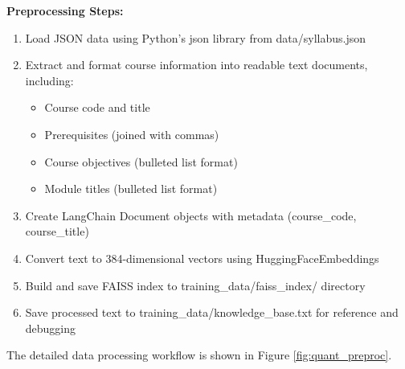 \documentclass[conference]{IEEEtran}
\begin{document}
\textbf{Preprocessing Steps:}
\begin{enumerate}
    \item Load JSON data using Python's json library from data/syllabus.json
    \item Extract and format course information into readable text documents, including:
        \begin{itemize}
           \item Course code and title
           \item Prerequisites (joined with commas)
           \item Course objectives (bulleted list format)
           \item Module titles (bulleted list format)
        \end{itemize}
    \item Create LangChain Document objects with metadata (course\_code, course\_title)
    \item Convert text to 384-dimensional vectors using HuggingFaceEmbeddings
    \item Build and save FAISS index to training\_data/faiss\_index/ directory
    \item Save processed text to training\_data/knowledge\_base.txt for reference and debugging
\end{enumerate}

The detailed data processing workflow is shown in Figure \ref{fig:quant_preproc}.

\begin{table}[t!]
\caption{Dataset Course Details}
\centering
{}
\label{tab:dataset}
\end{table}
\end{document}
